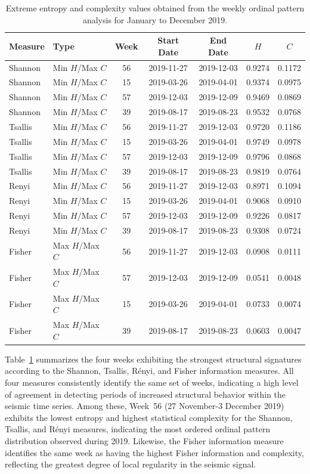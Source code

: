 \documentclass[12pt,a4paper]{article}
\begin{document}
\begin{table}[H]
	\centering
	\caption{Extreme entropy and complexity values obtained from the weekly ordinal pattern analysis for January to December 2019.}
	\label{tab:weekly_extremes}
	\small
	\begin{tabular}{llccccc}
		\toprule
		Measure & Type & Week & Start Date & End Date & $H$ & $C$ \\
		\midrule
		Shannon & Min $H$/Max $C$ & 56 & 2019-11-27 & 2019-12-03 & 0.9274 & 0.1172 \\
		Shannon & Min $H$/Max $C$ & 15 & 2019-03-26 & 2019-04-01 & 0.9374 & 0.0975 \\
		Shannon & Min $H$/Max $C$ & 57 & 2019-12-03 & 2019-12-09 & 0.9469 & 0.0869 \\
		Shannon & Min $H$/Max $C$ & 39 & 2019-08-17 & 2019-08-23 & 0.9532 & 0.0768 \\
		\midrule
		Tsallis & Min $H$/Max $C$ & 56 & 2019-11-27 & 2019-12-03 & 0.9720 & 0.1186 \\
		Tsallis & Min $H$/Max $C$ & 15 & 2019-03-26 & 2019-04-01 & 0.9749 & 0.0978 \\
		Tsallis & Min $H$/Max $C$ & 57 & 2019-12-03 & 2019-12-09 & 0.9796 & 0.0868 \\
		Tsallis & Min $H$/Max $C$ & 39 & 2019-08-17 & 2019-08-23 & 0.9819 & 0.0764 \\
		\midrule
		Renyi & Min $H$/Max $C$ & 56 & 2019-11-27 & 2019-12-03 & 0.8971 & 0.1094 \\
		Renyi & Min $H$/Max $C$ & 15 & 2019-03-26 & 2019-04-01 & 0.9068 & 0.0910 \\
		Renyi & Min $H$/Max $C$ & 57 & 2019-12-03 & 2019-12-09 & 0.9226 & 0.0817 \\
		Renyi & Min $H$/Max $C$ & 39 & 2019-08-17 & 2019-08-23 & 0.9308 & 0.0724 \\
		\midrule
		Fisher & Max $H$/Max $C$ & 56 & 2019-11-27 & 2019-12-03 & 0.0908 & 0.0111 \\
		Fisher & Max $H$/Max $C$ & 57 & 2019-12-03 & 2019-12-09 & 0.0541 & 0.0048 \\
		Fisher & Max $H$/Max $C$ & 15 & 2019-03-26 & 2019-04-01 & 0.0733 & 0.0074 \\
		Fisher & Max $H$/Max $C$ & 39 & 2019-08-17 & 2019-08-23 & 0.0603 & 0.0047 \\
		\bottomrule
	\end{tabular}
\end{table}

Table~\ref{tab:weekly_extremes} summarizes the four weeks exhibiting the strongest structural signatures according to the Shannon, Tsallis, R\'enyi, and Fisher information measures. All four measures consistently identify the same set of weeks, indicating a high level of agreement in detecting periods of increased structural behavior within the seismic time series. Among these, Week~56 (27 November-3 December 2019) exhibits the lowest entropy and highest statistical complexity for the Shannon, Tsallis, and R\'enyi measures, indicating the most ordered ordinal pattern distribution observed during 2019. Likewise, the Fisher information measure identifies the same week as having the highest Fisher information and complexity, reflecting the greatest degree of local regularity in the seismic signal.
\end{document}
